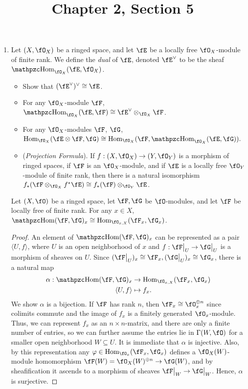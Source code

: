 \documentclass[a4paper]{article}
\title{Chapter 2, Section 5}
\begin{document}
\maketitle
\begin{enumerate} [label=\textbf{\arabic*.}, leftmargin=0em]

\item[\textbf{1.}] Let $(X, \fO_X)$ be a ringed space, and let $\fE$ be a locally free $\fO_X$-module of finite rank. We define the \textit{dual} of $\fE$, denoted $\fE^\vee$ to be the sheaf $\rHom_{\fO_X}(\fE, \fO_X)$.
\begin{itemize}
    \item[(a)] Show that $(\fE^\vee)^\vee \cong \fE$.
    \item[(b)] For any $\fO_X$-module $\fF$, $\rHom_{\fO_X}(\fE, \fF) \cong \fE^\vee \otimes_{\fO_X} \fF$.
    \item[(c)] For any $\fO_X$-modules $\fF$, $\fG$, $\Hom_{\fO_X}(\fE \otimes \fF, \fG) \cong \Hom_{\fO_X}(\fF, \rHom_{\fO_X}(\fE, \fG)).$
    \item[(d)] (\textit{Projection Formula}). If $f : (X, \fO_X) \to (Y, \fO_Y)$ is a morphism of ringed spaces, if $\fF$ is an $\fO_X$-module, and if $\fE$ is a locally free $\fO_Y$-module of finite rank, then there is a natural isomorphism $f_*(\fF \otimes_{\fO_X} f^* \fE) \cong f_*(\fF) \otimes_{\fO_Y} \fE$.
\end{itemize}

\begin{lemma}
    Let $(X, \fO)$ be a ringed space, let $\fF, \fG$ be $\fO$-modules, and let $\fF$ be locally free of finite rank. For any $x \in X$, $\rHom(\fF, \fG)_x \cong \Hom_{\fO_{x, X}}(\fF_x, \fG_x)$.
\end{lemma}

\begin{proof}
    An element of $\rHom(\fF, \fG)_x$ can be represented as a pair $\langle U, f \rangle$, where $U$ is an open neighborhood of $x$ and $f : \restr{\fF}{U} \to \restr{\fG}{U}$ is a morphism of sheaves on $U$. Since $(\restr{\fF}{U})_x \cong \fF_x, (\restr{\fG}{U})_x \cong \fG_x$, there is a natural map
    \begin{align*}
        \alpha : \rHom(\fF, \fG)_x & \to \Hom_{\fO_{x, X}}(\fF_x, \fG_x) \\
        \langle U, f \rangle & \mapsto f_x.
    \end{align*}
    We show $\alpha$ is a bijection. If $\fF$ has rank $n$, then $\fF_x \cong \fO_{x}^{\oplus n}$ since colimits commute and the image of $f_x$ is a finitely generated $\fO_{x}$-module. Thus, we can represent $f_x$ as an $n \times n$-matrix, and there are only a finite number of entries, so we can further assume the entries lie in $\Gamma(W, \fO)$ for a smaller open neighborhood $W \subseteq U$. It is immediate that $\alpha$ is injective. Also, by this representation any $\varphi \in \Hom_{\fO_{x}}(\fF_x, \fG_x)$ defines a $\fO_X(W)$-module homomorphism $\fF(W) = \fO_{X}(W)^{\oplus n} \to \fG(W)$, and by sheafification it ascends to a morphism of sheaves $\restr{\fF}{W} \to \restr{\fG}{W}$. Hence, $\alpha$ is surjective.
\end{proof}


\end{enumerate}
\end{document}
